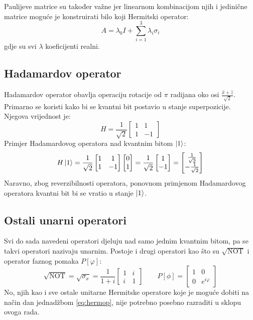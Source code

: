 Paulijeve matrice su također važne jer linearnom kombinacijom njih i jedinične matrice moguće je konstruirati bilo koji Hermitski operator:
\begin{equation}
A = \lambda_0I + \sum_{i = 1}^3\lambda_i\sigma_i
\label{eq:hermop}
\end{equation}
gdje su svi $\lambda$ koeficijenti realni.


\subsection{Hadamardov operator}

Hadamardov operator obavlja operaciju rotacije od $\pi$ radijana oko osi $\frac{\hat{x} + \hat{z}}{\sqrt{2}}$. Primarno se koristi kako bi se kvantni bit postavio u stanje superpozicije. Njegova vrijednost je:
\begin{equation}
H = \frac{1}{\sqrt{2}}\begin{bmatrix}
1 & 1 \\ 1 & -1
\end{bmatrix}
\end{equation}
Primjer Hadamardovog operatora nad kvantnim bitom $\ket{1}$:
\begin{equation}
H\ket{1} = \frac{1}{\sqrt{2}}\begin{bmatrix}
1 & 1 \\ 1 & -1
\end{bmatrix}
\begin{bmatrix}
0 \\ 1
\end{bmatrix}
= \frac{1}{\sqrt{2}} \begin{bmatrix} 1 \\ -1
\end{bmatrix}
= \begin{bmatrix}
\frac{1}{\sqrt{2}} \\ -\frac{1}{\sqrt{2}}
\end{bmatrix}
\end{equation}
Naravno, zbog reverzibilnosti operatora, ponovnom primjenom Hadamardovog operatora kvantni bit bi se vratio u stanje $\ket{1}$.

\subsection{Ostali unarni operatori}

Svi do sada navedeni operatori djeluju nad samo jednim kvantnim bitom, pa se takvi operatori nazivaju unarnim. Postoje i drugi operatori kao što su $\sqrt{\text{NOT}}$ i operator faznog pomaka $P[\varphi]$:
\begin{equation}
\sqrt{\text{NOT}} = \sqrt{\sigma_x} = \frac{1}{1+i}\begin{bmatrix}
1 & i \\ i & 1
\end{bmatrix}
\qquad
P[\phi] = \begin{bmatrix}
1 & 0 \\ 0 & e^{i\varphi}
\end{bmatrix}
\end{equation}
No, njih kao i sve ostale unitarne Hermitske operatore koje je moguće dobiti na način dan jednadžbom \ref{eq:hermop}, nije potrebno posebno razraditi u sklopu ovoga rada. 

